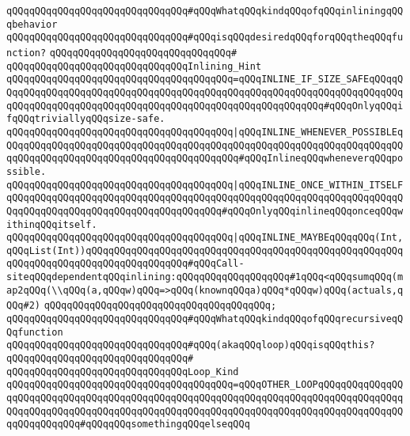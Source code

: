 \verb|qQQqqQQqqQQqqQQqqQQqqQQqqQQqqQQq#qQQqWhatqQQqkindqQQqofqQQqinliningqQQqbehavior|\newline
\verb|qQQqqQQqqQQqqQQqqQQqqQQqqQQqqQQq#qQQqisqQQqdesiredqQQqforqQQqtheqQQqfunction?|\newline
\verb|qQQqqQQqqQQqqQQqqQQqqQQqqQQqqQQq#|\newline
\verb|qQQqqQQqqQQqqQQqqQQqqQQqqQQqqQQqInlining_Hint|\newline
\verb|qQQqqQQqqQQqqQQqqQQqqQQqqQQqqQQqqQQqqQQq=qQQqINLINE_IF_SIZE_SAFEqQQqqQQqqQQqqQQqqQQqqQQqqQQqqQQqqQQqqQQqqQQqqQQqqQQqqQQqqQQqqQQqqQQqqQQqqQQqqQQqqQQqqQQqqQQqqQQqqQQqqQQqqQQqqQQqqQQqqQQqqQQqqQQqqQQq#qQQqOnlyqQQqifqQQqtriviallyqQQqsize-safe.|\newline
\verb|qQQqqQQqqQQqqQQqqQQqqQQqqQQqqQQqqQQqqQQq|\verb#|qQQqINLINE_WHENEVER_POSSIBLEqQQqqQQqqQQqqQQqqQQqqQQqqQQqqQQqqQQqqQQqqQQqqQQqqQQqqQQqqQQqqQQqqQQqqQQqqQQqqQQqqQQqqQQqqQQqqQQqqQQqqQQqqQQqqQQq#\verb|#qQQqInlineqQQqwheneverqQQqpossible.|\newline
\verb|qQQqqQQqqQQqqQQqqQQqqQQqqQQqqQQqqQQqqQQq|\verb#|qQQqINLINE_ONCE_WITHIN_ITSELFqQQqqQQqqQQqqQQqqQQqqQQqqQQqqQQqqQQqqQQqqQQqqQQqqQQqqQQqqQQqqQQqqQQqqQQqqQQqqQQqqQQqqQQqqQQqqQQqqQQqqQQqqQQq#\verb|#qQQqOnlyqQQqinlineqQQqonceqQQqwithinqQQqitself.|\newline
\verb|qQQqqQQqqQQqqQQqqQQqqQQqqQQqqQQqqQQqqQQq|\verb#|qQQqINLINE_MAYBEqQQqqQQq(Int,qQQqList(Int))qQQqqQQqqQQqqQQqqQQqqQQqqQQqqQQqqQQqqQQqqQQqqQQqqQQqqQQqqQQqqQQqqQQqqQQqqQQqqQQqqQQqqQQq#\verb|#qQQqCall-siteqQQqdependentqQQqinlining:qQQqqQQqqQQqqQQqqQQq#1qQQq<qQQqsumqQQq(map2qQQq(\\qQQq(a,qQQqw)qQQq=>qQQq(knownqQQqa)qQQq*qQQqw)qQQq(actuals,qQQq#2)|\newline
\verb|qQQqqQQqqQQqqQQqqQQqqQQqqQQqqQQqqQQqqQQq;|\newline
\newline
\verb|qQQqqQQqqQQqqQQqqQQqqQQqqQQqqQQq#qQQqWhatqQQqkindqQQqofqQQqrecursiveqQQqfunction|\newline
\verb|qQQqqQQqqQQqqQQqqQQqqQQqqQQqqQQq#qQQq(akaqQQqloop)qQQqisqQQqthis?|\newline
\verb|qQQqqQQqqQQqqQQqqQQqqQQqqQQqqQQq#|\newline
\verb|qQQqqQQqqQQqqQQqqQQqqQQqqQQqqQQqLoop_Kind|\newline
\verb|qQQqqQQqqQQqqQQqqQQqqQQqqQQqqQQqqQQqqQQq=qQQqOTHER_LOOPqQQqqQQqqQQqqQQqqQQqqQQqqQQqqQQqqQQqqQQqqQQqqQQqqQQqqQQqqQQqqQQqqQQqqQQqqQQqqQQqqQQqqQQqqQQqqQQqqQQqqQQqqQQqqQQqqQQqqQQqqQQqqQQqqQQqqQQqqQQqqQQqqQQqqQQqqQQqqQQqqQQqqQQq#qQQqqQQqsomethingqQQqelseqQQq|\newline
